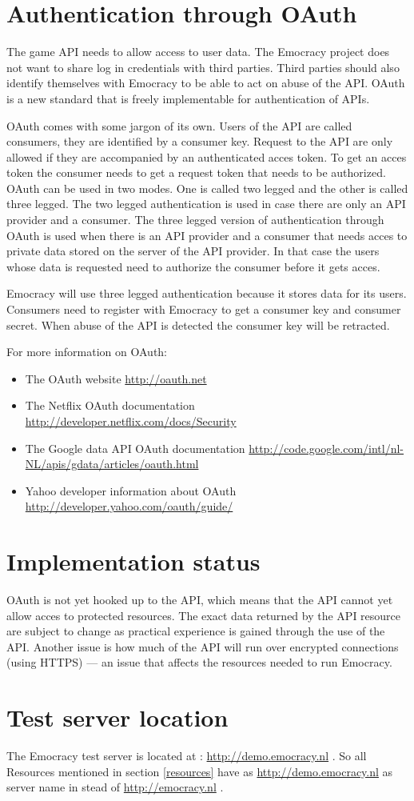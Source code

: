 \documentclass[a4paper]{report}
\begin{document}
\section{Authentication through OAuth}
The game API needs to allow access to user data. The Emocracy project does not 
want to share log in credentials with third parties. Third parties should also 
identify themselves with Emocracy to be able to act on abuse of the API. OAuth 
is a new standard that is freely implementable for authentication of APIs. 

OAuth comes with some jargon of its own. Users of the API are called consumers, 
they are identified by a consumer key. Request to the API are only allowed if
they are accompanied by an authenticated acces token. To get an acces token the
consumer needs to get a request token that needs to be authorized. OAuth can be 
used in two modes. One is called two legged and the other is called three 
legged. The two legged authentication is used in case there are only an API 
provider and a consumer. The three legged version of authentication through 
OAuth is used when there is an API provider and a consumer that needs acces to
private data stored on the server of the API provider. In that case the users 
whose data is requested need to authorize the consumer before it gets acces.

Emocracy will use three legged authentication because it stores data for its 
users. Consumers need to register with Emocracy to get a consumer key and 
consumer secret. When abuse of the API is detected the consumer key will be 
retracted. 

For more information on OAuth:
\begin{itemize}
    \item{The OAuth website \url{http://oauth.net}}
    \item{The Netflix OAuth documentation \url{http://developer.netflix.com/docs/Security}}
    \item{The Google data API OAuth documentation \url{http://code.google.com/intl/nl-NL/apis/gdata/articles/oauth.html}}
    \item{Yahoo developer information about OAuth \url{http://developer.yahoo.com/oauth/guide/}}
\end{itemize}

\section{Implementation status}
OAuth is not yet hooked up to the API, which means that the API cannot yet allow
acces to protected resources. The exact data returned by the API resource are 
subject to change as practical experience is gained through the use of the API.
Another issue is how much of the API will run over encrypted connections (using
HTTPS) --- an issue that affects the resources needed to run Emocracy.
\section{Test server location}
The Emocracy test server is located at : \url{http://demo.emocracy.nl} . So all
Resources mentioned in section \ref{resources} have as \url{http://demo.emocracy.nl}
as server name in stead of \url{http://emocracy.nl} .
\end{document}
